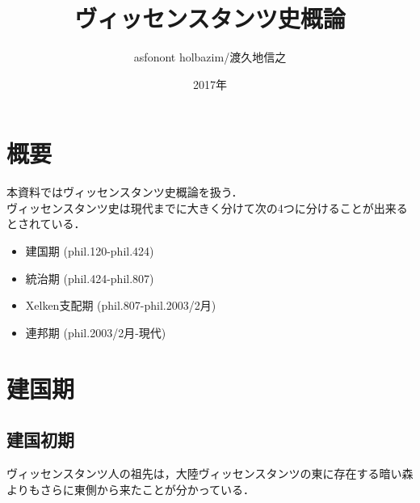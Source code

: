 \documentclass[a4paper,xelatex,ja=standard]{bxjsarticle}
\begin{document}
{
\title{\Huge ヴィッセンスタンツ史概論}
\author{asfonont holbazim/渡久地信之}
\date{2017年}
}
\maketitle
\thispagestyle{empty}


\newpage

\tableofcontents

\newpage
{}

\section{概要}
本資料ではヴィッセンスタンツ史概論を扱う．\\
ヴィッセンスタンツ史は現代までに大きく分けて次の4つに分けることが出来るとされている．
\begin{itemize}
 \item 建国期 (phil.120-phil.424)
 \item 統治期 (phil.424-phil.807)
 \item Xelken支配期 (phil.807-phil.2003/2月)
 \item 連邦期 (phil.2003/2月-現代)
\end{itemize}

\section{建国期}
\subsection{建国初期}
ヴィッセンスタンツ人の祖先は，大陸ヴィッセンスタンツの東に存在する暗い森よりもさらに東側から来たことが分かっている．


\end{document}
